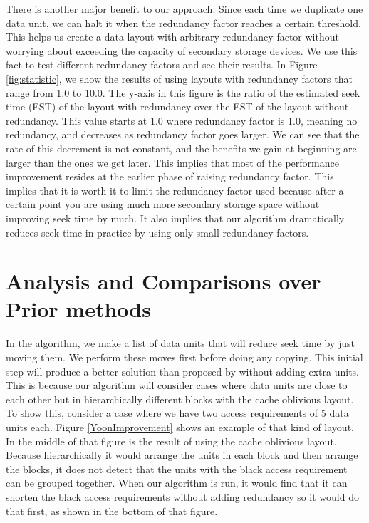 \documentclass[conference]{acmsiggraph}
\begin{document}
There is another major benefit to our approach. Since each time we duplicate one data unit, we can halt it when the redundancy factor reaches a certain threshold. This helps us create a data layout with arbitrary redundancy factor without worrying about exceeding the capacity of secondary storage devices. We use this fact to test different redundancy factors and see their results. In Figure \ref{fig:statistic}, we show the results of using layouts with redundancy factors that range from 1.0 to 10.0. The y-axis in this figure is the ratio of the estimated seek time (EST) of the layout with redundancy over the EST of the layout without redundancy. This value starts at 1.0 where redundancy factor is 1.0, meaning no redundancy, and decreases as redundancy factor goes larger. We can see that the rate of this decrement is not constant, and the benefits we gain at beginning are larger than the ones we get later. This implies that most of the performance improvement resides at the earlier phase of raising redundancy factor. This implies that it is worth it to limit the redundancy factor used because after a certain point you are using much more secondary storage space without improving seek time by much. It also implies that our algorithm dramatically reduces seek time in practice by using only small redundancy factors. 

\section{Analysis and Comparisons over Prior methods}

In the algorithm, we make a list of data units that will reduce seek time by just moving them. We perform these moves first before doing any copying. This initial step will produce a better solution than proposed by \cite{cacheobliviouslayout} without adding extra units. This is because our algorithm will consider cases where data units are close to each other but in hierarchically different blocks with  the cache oblivious layout. To show this, consider a case where we have two access requirements of 5 data units each. Figure \ref{YoonImprovement} shows an example of that kind of layout. In the middle of that figure is the result of using the cache oblivious layout. Because hierarchically it would arrange the units in each block and then arrange the blocks, it does not detect that the units with the black access requirement can be grouped together. When our algorithm is run, it would find that it can shorten the black access requirements without adding redundancy so it would do that first, as shown in the bottom of that figure.
\end{document}
